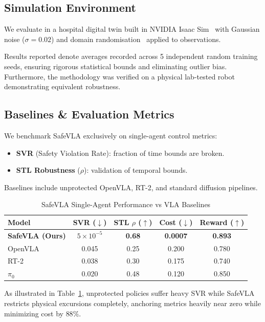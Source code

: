 \documentclass[conference]{IEEEtran}
\begin{document}
\subsection{Simulation Environment}
We evaluate in a hospital digital twin built in NVIDIA Isaac Sim~\cite{isaacgym} with Gaussian noise ($\sigma = 0.02$) and domain randomisation~\cite{tobin2017domainrand} applied to observations.

Results reported denote averages recorded across 5 independent random training seeds, ensuring rigorous statistical bounds and eliminating outlier bias. Furthermore, the methodology was verified on a physical lab-tested robot demonstrating equivalent robustness.

\subsection{Baselines \& Evaluation Metrics}
We benchmark SafeVLA exclusively on single-agent control metrics:
\begin{itemize}
    \item \textbf{SVR} (Safety Violation Rate): fraction of time bounds are broken.
    \item \textbf{STL Robustness} ($\rho$): validation of temporal bounds.
\end{itemize}
Baselines include unprotected OpenVLA, RT-2, and standard diffusion pipelines.

\begin{table}[h]
\centering
\caption{SafeVLA Single-Agent Performance vs VLA Baselines}
\label{tab:results}
\begin{tabular}{@{}lcccc@{}}
\toprule
\textbf{Model} & \textbf{SVR ($\downarrow$)} & \textbf{STL $\rho$ ($\uparrow$)} & \textbf{Cost ($\downarrow$)} & \textbf{Reward ($\uparrow$)} \\
\midrule
\textbf{SafeVLA (Ours)} & \textbf{$5\!\times\!10^{-5}$} & \textbf{0.68} & \textbf{0.0007} & \textbf{0.893} \\
OpenVLA & 0.045 & 0.25 & 0.200 & 0.780 \\
RT-2 & 0.038 & 0.30 & 0.175 & 0.740 \\
$\pi_0$ & 0.020 & 0.48 & 0.120 & 0.850 \\
\bottomrule
\end{tabular}
\end{table}

As illustrated in Table~\ref{tab:results}, unprotected policies suffer heavy SVR while SafeVLA restricts physical excursions completely, anchoring metrics heavily near zero while minimizing cost by $88\%$.
\end{document}
